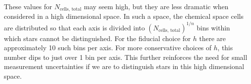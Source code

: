 \documentclass[a4paper,fleqn,usenatbib]{mnras}
\newcommand       \teff     {{T_{\mathrm{eff}}}}
\newcommand       \Rsq      {{R^2}}
\newcommand       \Rnoise   {{R^2_{\mathrm{noise}}}}
\begin{document}
These values for $N_{\mathrm{cells,\,total}}$ may seem high, but they are less dramatic when considered in a high dimensional space. In such a space, the chemical space cells are distributed so that each axis is divided into $\left(N_{\mathrm{cells,\,total}}\right)^{1/n}$ bins within which stars cannot be distinguished. For the fiducial choice for $h$ there are approximately 10  such bins per axis. For more conservative choices of $h$, this number dips to just over 1 bin per axis. This further reinforces the need for small measurement uncertainties if we are to distinguish stars in this high dimensional space.




\end{document}
